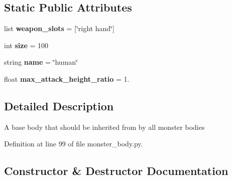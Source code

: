 \subsection*{Static Public Attributes}
\begin{DoxyCompactItemize}
\item 
\hypertarget{classmonster__body_1_1_human_body_a311106a6662abeed8e75da1cb1bdc82d}{}list {\bfseries weapon\+\_\+slots} = \mbox{[}\char`\"{}right hand\char`\"{}\mbox{]}\label{classmonster__body_1_1_human_body_a311106a6662abeed8e75da1cb1bdc82d}

\item 
\hypertarget{classmonster__body_1_1_human_body_a8ce06823f04afb91da9e696276182531}{}int {\bfseries size} = 100\label{classmonster__body_1_1_human_body_a8ce06823f04afb91da9e696276182531}

\item 
\hypertarget{classmonster__body_1_1_human_body_a38279ea5f72ea0031f1bc7418c811162}{}string {\bfseries name} = \char`\"{}human\char`\"{}\label{classmonster__body_1_1_human_body_a38279ea5f72ea0031f1bc7418c811162}

\item 
\hypertarget{classmonster__body_1_1_human_body_a1faf8072cedcecb17ef3f00babaf6ca7}{}float {\bfseries max\+\_\+attack\+\_\+height\+\_\+ratio} = 1.\label{classmonster__body_1_1_human_body_a1faf8072cedcecb17ef3f00babaf6ca7}

\end{DoxyCompactItemize}


\subsection{Detailed Description}
\begin{DoxyVerb}A base body that should be inherited from by all monster bodies
\end{DoxyVerb}
 

Definition at line 99 of file monster\+\_\+body.\+py.



\subsection{Constructor \& Destructor Documentation}
\hypertarget{classmonster__body_1_1_human_body_a1964b8b013b4a90d0297b0fe762d2878}{}
